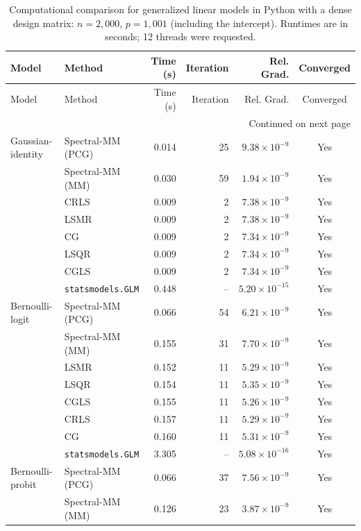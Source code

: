\documentclass[10pt,a4paper]{article}
\begin{document}
\begingroup
\small
\setlength{\tabcolsep}{5pt}
\begin{longtable}{llrrrc}
\caption{Computational comparison for generalized linear models in Python with a dense design matrix: $n=2{,}000$, $p=1{,}001$ (including the intercept). Runtimes are in seconds; 12 threads were requested.}
\label{tab:python-dense-glm-strict}\\
\toprule
Model & Method & Time (s) & Iteration & Rel. Grad. & Converged \\
\midrule
\endfirsthead
\toprule
Model & Method & Time (s) & Iteration & Rel. Grad. & Converged \\
\midrule
\endhead
\midrule
\multicolumn{6}{r}{Continued on next page}\\
\endfoot
\bottomrule
\endlastfoot
Gaussian-identity & Spectral-MM (PCG) & 0.014 & 25 & $9.38\times10^{-9}$ & Yes \\
 & Spectral-MM (MM) & 0.030 & 59 & $1.94\times10^{-9}$ & Yes \\
 & CRLS & 0.009 & 2 & $7.38\times10^{-9}$ & Yes \\
 & LSMR & 0.009 & 2 & $7.38\times10^{-9}$ & Yes \\
 & CG & 0.009 & 2 & $7.34\times10^{-9}$ & Yes \\
 & LSQR & 0.009 & 2 & $7.34\times10^{-9}$ & Yes \\
 & CGLS & 0.009 & 2 & $7.34\times10^{-9}$ & Yes \\
 & \texttt{statsmodels.GLM} & 0.448 & -- & $5.20\times10^{-15}$ & Yes \\
\midrule
Bernoulli-logit & Spectral-MM (PCG) & 0.066 & 54 & $6.21\times10^{-9}$ & Yes \\
 & Spectral-MM (MM) & 0.155 & 31 & $7.70\times10^{-9}$ & Yes \\
 & LSMR & 0.152 & 11 & $5.29\times10^{-9}$ & Yes \\
 & LSQR & 0.154 & 11 & $5.35\times10^{-9}$ & Yes \\
 & CGLS & 0.155 & 11 & $5.26\times10^{-9}$ & Yes \\
 & CRLS & 0.157 & 11 & $5.29\times10^{-9}$ & Yes \\
 & CG & 0.160 & 11 & $5.31\times10^{-9}$ & Yes \\
 & \texttt{statsmodels.GLM} & 3.305 & -- & $5.08\times10^{-16}$ & Yes \\
\midrule
Bernoulli-probit & Spectral-MM (PCG) & 0.066 & 37 & $7.56\times10^{-9}$ & Yes \\
 & Spectral-MM (MM) & 0.126 & 23 & $3.87\times10^{-9}$ & Yes \\

\end{longtable}
\end{document}
